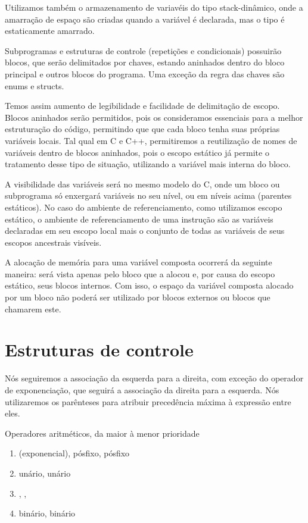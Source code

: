 Utilizamos também o armazenamento de variavéis do tipo stack-dinâmico, onde a
amarração de espaço são criadas quando a variável é declarada, mas o tipo é
estaticamente amarrado.

Subprogramas e estruturas de controle (repetições e condicionais) possuirão
blocos, que serão delimitados por chaves, estando aninhados dentro do bloco
principal e outros blocos do programa. Uma exceção da regra das chaves são
enums e structs.

Temos assim aumento de legibilidade e facilidade de delimitação de escopo.
Blocos aninhados serão permitidos, pois os consideramos essenciais para a
melhor estruturação do código, permitindo que que cada bloco tenha suas
próprias variáveis locais. Tal qual em C e C++, permitiremos a reutilização de
nomes de variáveis dentro de blocos aninhados, pois o escopo estático já
permite o tratamento desse tipo de situação, utilizando a variável mais interna
do bloco.

A visibilidade das variáveis será no mesmo modelo do C, onde um bloco ou
subprograma só enxergará variáveis no seu nível, ou em níveis acima (parentes
estáticos). No caso do ambiente de referenciamento, como utilizamos escopo
estático, o ambiente de referenciamento de uma instrução são as variáveis
declaradas em seu escopo local mais o conjunto de todas as variáveis de seus
escopos ancestrais visíveis.

A alocação de memória para uma variável composta ocorrerá da seguinte maneira:
será vista apenas pelo bloco que a alocou e, por causa do escopo estático, seus
blocos internos. Com isso, o espaço da variável composta alocado por um bloco
não poderá ser utilizado por blocos externos ou blocos que chamarem este.

\section{Estruturas de controle}
Nós seguiremos a associação da esquerda para a direita, com exceção do operador
de exponenciação, que seguirá a associação da direita para a esquerda. Nós
utilizaremos os parênteses para atribuir precedência máxima à expressão entre
eles.

Operadores aritméticos, da maior à menor prioridade
\begin{enumerate}
    \item
    \ic{^} (exponencial), \ic{++} pósfixo,  \ic{--} pósfixo
    \item
    \ic{+} unário, \ic{-} unário
    \item
    \ic{*}, \ic{/},  \ic{\%}
    \item
    \ic{+} binário, \ic{-} binário
\end{enumerate}

